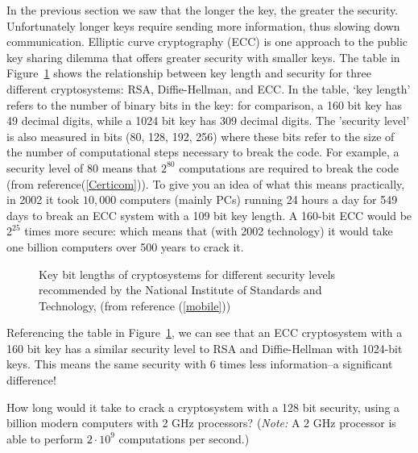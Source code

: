 In the previous section we saw that the longer the key, the greater the security. Unfortunately longer keys require sending more information, thus slowing down communication.  Elliptic curve cryptography (ECC) is one approach to the public key sharing dilemma that offers greater security with smaller keys. The table in Figure~\ref{fig:DH:DHKE_9} shows the relationship between key length and security for three different cryptosystems: RSA, Diffie-Hellman, and ECC.  In the table, `key length' refers to the number of binary bits in the key: for comparison, a 160 bit key has 49 decimal digits, while a 1024 bit key has 309 decimal digits. The 'security level' is also measured in bits (80, 128, 192, 256) where these bits refer to the size of the number of computational steps necessary to break the code.  For example, a security level of 80 means that $2^{80}$ computations are required to break the code (from reference(\ref{Certicom})). To give you an idea of what this means practically, in 2002 it took $10,000$ computers (mainly PCs) running 24 hours a day for 549 days to break an ECC system with a 109 bit key length. A 160-bit ECC would be $2^{25}$ times more secure: which means that (with 2002 technology) it would take one billion computers over 500 years to crack it.
\begin{figure} [H]
	  \caption{\label{fig:DH:DHKE_9}Key bit lengths of cryptosystems for different security levels recommended by the National Institute of Standards and Technology, (from reference (\ref{mobile}))}
\end{figure}
Referencing the table in Figure~\ref{fig:DH:DHKE_9}, we can see that an ECC cryptosystem with a 160 bit key has a similar security level to RSA and Diffie-Hellman with 1024-bit keys. This means the same security with 6 times less information--a significant difference! 

\begin{exercise}{}
How long would it take to crack a cryptosystem with a 128 bit security, using a billion modern computers with 2 GHz processors? (\emph{Note:} A 2 GHz processor is able to perform $2 \cdot 10^9$ computations per second.)
\end{exercise}

